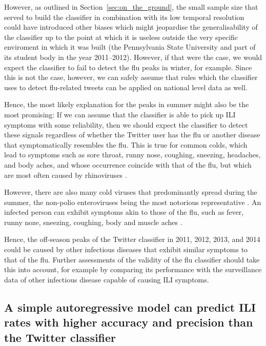 \documentclass[11pt, a4paper,twoside]{report}\usepackage[]{graphicx}\usepackage[]{color}
\begin{document}
However, as outlined in Section~\ref{sec:on_the_ground}, the small sample size that served to build the classifier in combination with its low temporal resolution could have introduced other biases which might jeopardise the generalisability of the classifier up to the point at which it is useless outside the very specific enviroment in which it was built (the Pennsylvania State University and part of its student body in the year 2011--2012). However, if that were the case, we would expect the classifier to fail to detect the flu peaks in winter, for example. Since this is not the case, however, we can safely assume that rules which the classifier uses to detect flu-related tweets can be applied on national level data as well. 

Hence, the most likely explanation for the peaks in summer might also be the most promising: If we can assume that the classifier is able to pick up ILI symptoms with some reliability, then we should expect the classifier to detect these signals regardless of whether the Twitter user has the flu or another disease that symptomatically resembles the flu. This is true for common colds, which lead to symptoms such as sore throat, runny nose, coughing, sneezing, headaches, and body aches, and whose occurrence coincide with that of the flu, but which are most often caused by rhinoviruses \citep{heikkinen2003common,cdc_rhinovirus_2017}. 

However, there are also many cold viruses that predominantly spread during the summer, the non-polio enteroviruses being the most notorious representative  \citep{pons2015epidemiology}. An infected person can exhibit symptoms akin to those of the flu, such as fever, runny noze, sneezing, coughing, body and muscle aches \citep{pons2015epidemiology,cdc_enterovirus_2016}.

Hence, the off-season peaks of the Twitter classifier in 2011, 2012, 2013, and 2014 could be caused by other infectious diseases that exhibit similar symptoms to that of the flu. Further assessments of the validity of the flu classifier should take this into account, for example by comparing its performance with the surveillance data of other infectious disease capable of causing ILI symptoms.

\subsection{A simple autoregressive model can predict ILI rates with higher accuracy and precision than the Twitter classifier}
\end{document}
